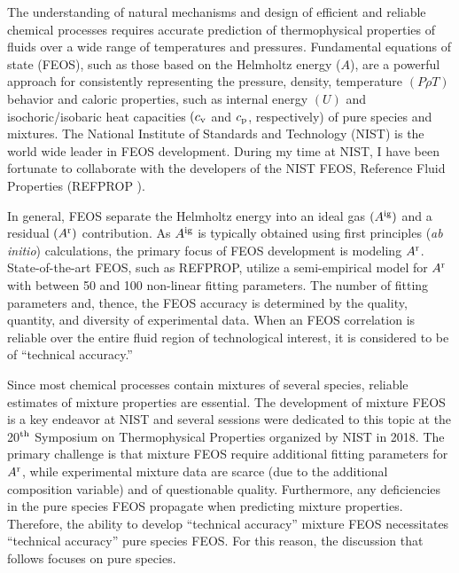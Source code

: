 \documentclass[12pt,a4paper]{article}
\begin{document}
The understanding of natural mechanisms and design of efficient and reliable chemical processes requires accurate prediction of thermophysical properties of fluids over a wide range of temperatures and pressures. Fundamental equations of state (FEOS), such as those based on the Helmholtz energy ($A$), are a powerful approach for consistently representing the pressure, density, temperature $(P\rho T)$ behavior and caloric properties, such as internal energy $(U)$ and isochoric/isobaric heat capacities $(c_{\rm v}$ and $c_{\rm p}$, respectively) of pure species and mixtures. The National Institute of Standards and Technology (NIST) is the world wide leader in FEOS development. During my time at NIST, I have been fortunate to collaborate with the developers of the NIST FEOS, Reference Fluid Properties (REFPROP \cite{LEMMON-RP91}). 


In general, FEOS separate the Helmholtz energy into an ideal gas $(A^{\rm ig})$ and a residual $(A^{\rm r})$ contribution. As $A^{\rm ig}$ is typically obtained using first principles (\textit{ab initio}) calculations, the primary focus of FEOS development is modeling $A^{\rm r}$. State-of-the-art FEOS, such as REFPROP, utilize a semi-empirical model for $A^{\rm r}$ with between 50 and 100 non-linear fitting parameters. The number of fitting parameters and, thence, the FEOS accuracy is determined by the quality, quantity, and diversity of experimental data. When an FEOS correlation is reliable over the entire fluid region of technological interest, it is considered to be of ``technical accuracy.'' 

Since most chemical processes contain mixtures of several species, reliable estimates of mixture properties are essential. The development of mixture FEOS is a key endeavor at NIST and several sessions were dedicated to this topic at the 20$^{\rm th}$ Symposium on Thermophysical Properties organized by NIST in 2018. The primary challenge is that mixture FEOS require additional fitting parameters for $A^{\rm r}$, while experimental mixture data are scarce (due to the additional composition variable) and of questionable quality. Furthermore, any deficiencies in the pure species FEOS propagate when predicting mixture properties. Therefore, the ability to develop ``technical accuracy'' mixture FEOS necessitates ``technical accuracy'' pure species FEOS. For this reason, the discussion that follows focuses on pure species. 
\end{document}
